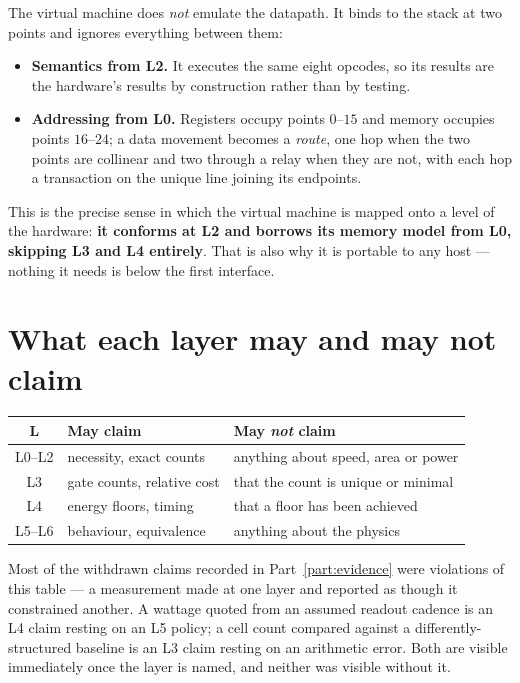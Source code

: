 The virtual machine does \emph{not} emulate the datapath. It binds to the stack at two
points and ignores everything between them:

\begin{itemize}
  \item \textbf{Semantics from L2.} It executes the same eight opcodes, so its results are
        the hardware's results by construction rather than by testing.
  \item \textbf{Addressing from L0.} Registers occupy points $0$--$15$ and memory occupies
        points $16$--$24$; a data movement becomes a \emph{route}, one hop when the two
        points are collinear and two through a relay when they are not, with each hop a
        transaction on the unique line joining its endpoints.
\end{itemize}

This is the precise sense in which the virtual machine is mapped onto a level of the
hardware: \textbf{it conforms at L2 and borrows its memory model from L0, skipping L3 and
L4 entirely}. That is also why it is portable to any host --- nothing it needs is below the
first interface.

\section{What each layer may and may not claim}

\begin{center}
\small
\begin{tabular}{@{}c l l@{}}
\toprule
\textbf{L} & \textbf{May claim} & \textbf{May \emph{not} claim} \\
\midrule
L0--L2 & necessity, exact counts & anything about speed, area or power \\
L3     & gate counts, relative cost & that the count is unique or minimal \\
L4     & energy floors, timing & that a floor has been achieved \\
L5--L6 & behaviour, equivalence & anything about the physics \\
\bottomrule
\end{tabular}
\end{center}

\noindent Most of the withdrawn claims recorded in Part~\ref{part:evidence} were violations
of this table --- a measurement made at one layer and reported as though it constrained
another. A wattage quoted from an assumed readout cadence is an L4 claim resting on an L5
policy; a cell count compared against a differently-structured baseline is an L3 claim
resting on an arithmetic error. Both are visible immediately once the layer is named, and
neither was visible without it.

